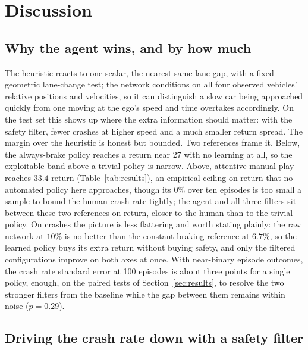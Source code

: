 \documentclass{article}
\newcommand{\agenttestN}{100}
\begin{document}
\section{Discussion}
\label{sec:discussion}

\subsection{Why the agent wins, and by how much}

The heuristic reacts to one scalar, the nearest same-lane gap, with a fixed geometric lane-change test; the network conditions on all four observed vehicles' relative positions and velocities, so it can distinguish a slow car being approached quickly from one moving at the ego's speed and time overtakes accordingly. On the test set this shows up where the extra information should matter: with the safety filter, fewer crashes at higher speed and a much smaller return spread. The margin over the heuristic is honest but bounded. Two references frame it. Below, the always-brake policy reaches a return near 27 with no learning at all, so the exploitable band above a trivial policy is narrow. Above, attentive manual play reaches $33.4$ return (Table~\ref{tab:results}), an empirical ceiling on return that no automated policy here approaches, though its $0\%$ over ten episodes is too small a sample to bound the human crash rate tightly; the agent and all three filters sit between these two references on return, closer to the human than to the trivial policy. On crashes the picture is less flattering and worth stating plainly: the raw network at $10\%$ is no better than the constant-braking reference at $6.7\%$, so the learned policy buys its extra return without buying safety, and only the filtered configurations improve on both axes at once. With near-binary episode outcomes, the crash rate standard error at \agenttestN{} episodes is about three points for a single policy, enough, on the paired tests of Section~\ref{sec:results}, to resolve the two stronger filters from the baseline while the gap between them remains within noise ($p{=}0.29$).

\subsection{Driving the crash rate down with a safety filter}
\end{document}
